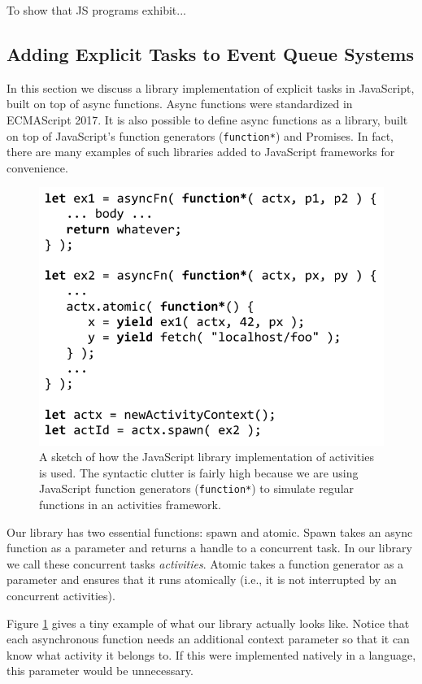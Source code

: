 \documentclass[acmsmall,anonymous,review]{acmart}\settopmatter{printfolios=true,printccs=false,printacmref=false}
\begin{document}
To show that JS programs exhibit...

\subsection{Adding Explicit Tasks to Event Queue Systems}

In this section we discuss a library implementation of explicit tasks in JavaScript, built on top of async functions.
Async functions were standardized in ECMAScript 2017.
It is also possible to define async functions as a library, built on top of JavaScript's function generators (\texttt{function*}) and Promises.
In fact, there are many examples of such libraries added to JavaScript frameworks for convenience.

\begin{figure}
\includegraphics[scale=0.65]{trivial_js}
\caption{A sketch of how the JavaScript library implementation of activities is used.
The syntactic clutter is fairly high because we are using JavaScript function generators (\texttt{function*}) to simulate regular functions in an activities framework.}
\label{fig:trivial_js}
\end{figure}

Our library has two essential functions: spawn and atomic.
Spawn takes an async function as a parameter and returns a handle to a concurrent task.
In our library we call these concurrent tasks \emph{activities}.
Atomic takes a function generator as a parameter and ensures that it runs atomically (i.e., it is not interrupted by an concurrent activities).

Figure \ref{fig:trivial_js} gives a tiny example of what our library actually looks like.
Notice that each asynchronous function needs an additional context parameter so that it can know what activity it belongs to.
If this were implemented natively in a language, this parameter would be unnecessary.
\end{document}
